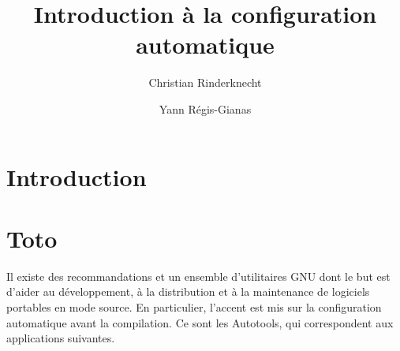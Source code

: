 \documentclass[11pt,a4paper]{article}
\title{Introduction à la configuration automatique}
\author{Christian Rinderknecht \and Yann Régis-Gianas}
\begin{document}
\maketitle

\tableofcontents

\section{Introduction}

\section{Toto}
Il existe des recommandations et un ensemble d'utilitaires
\textsf{GNU} dont le but est d'aider au développement, à la
distribution et à la maintenance de logiciels portables en mode
source. En particulier, l'accent est mis sur la configuration
automatique avant la compilation. Ce sont les \textsf{Autotools}, qui
correspondent aux applications suivantes.
\end{document}
